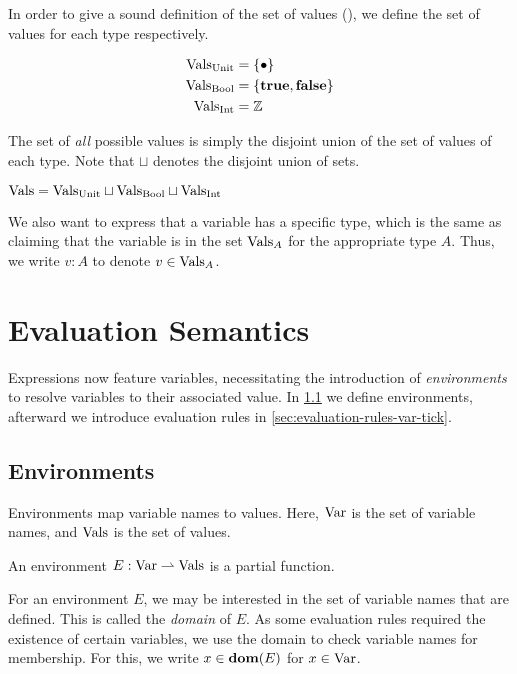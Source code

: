 In order to give a sound definition of the set of values (\Vals), we define the set of values for each type respectively. 

\begin{align*}
   \text{Vals}_{\text{Unit}} & = \{\bullet\} \\
   \text{Vals}_{\text{Bool}} & = \{\mathbf{true}, \mathbf{false}\} \\
   \text{Vals}_{\text{Int}} & = \mathbb{Z}
\end{align*}

The set of \emph{all} possible values is simply the disjoint union of the set of values of each type. Note that \(\sqcup\) denotes the disjoint union of sets.

\begin{definition}
   \(\text{Vals} = \text{Vals}_{\text{Unit}} \sqcup \text{Vals}_{\text{Bool}} \sqcup \text{Vals}_{\text{Int}}\)
\end{definition}

We also want to express that a variable has a specific type, which is the same as claiming that the variable is in the set \(\text{Vals}_{A}\) for the appropriate type \(A\). Thus, we write \(v : A\) to denote \(v \in \text{Vals}_{A}\).


\section{Evaluation Semantics}

Expressions now feature variables, necessitating the introduction of \emph{environments} to resolve variables to their associated value. In \cref{sec:environments} we define environments, afterward we introduce evaluation rules in \cref{sec:evaluation-rules-var-tick}.

\subsection{Environments}\label{sec:environments}

Environments map variable names to values. Here, \(\text{Var}\) is the set of variable names, and \(\text{Vals}\) is the set of values. 

\begin{definition}[Environment]\label{def:environment}
   An environment \(E: \text{Var} \rightharpoonup \text{\ensuremath{\text{Vals}}}\) is a partial function.
\end{definition}

For an environment \(E\), we may be interested in the set of variable names that are defined. This is called the \emph{domain} of \(E\). As some evaluation rules required the existence of certain variables, we use the domain to check variable names for membership. For this, we write \(x \in \textbf{dom}(E)\) for \(x \in \text{Var}\).

